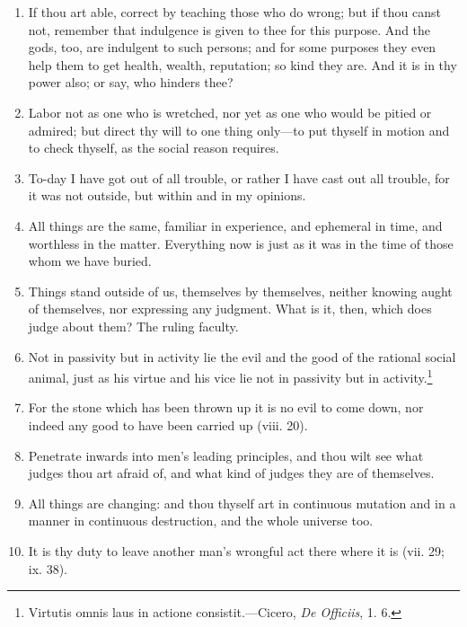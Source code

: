\begin{enumerate}
\item If thou art able, correct by teaching those who do wrong; but if thou canst not, remember that indulgence is given to thee for this purpose. And the gods, too, are indulgent to such persons; and for some purposes they even help them to get health, wealth, reputation; so kind they are. And it is in thy power also; or say, who hinders thee?

\item Labor not as one who is wretched, nor yet as one who would be pitied or admired; but direct thy will to one thing only—to put thyself in motion and to check thyself, as the social reason requires.

\item To-day I have got out of all trouble, or rather I have cast out all trouble, for it was not outside, but within and in my opinions.

\item All things are the same, familiar in experience, and ephemeral in time, and worthless in the matter. Everything now is just as it was in the time of those whom we have buried.

\item Things stand outside of us, themselves by themselves, neither knowing aught of themselves, nor expressing any judgment. What is it, then, which does judge about them? The ruling faculty.

\item Not in passivity but in activity lie the evil and the good of the rational social animal, just as his virtue and his vice lie not in passivity but in activity.\footnote{Virtutis omnis laus in actione consistit.—Cicero, \textit{De Officiis}, 1. 6.}

\item For the stone which has been thrown up it is no evil to come down, nor indeed any good to have been carried up (viii. 20).

\item Penetrate inwards into men's leading principles, and thou wilt see what judges thou art afraid of, and what kind of judges they are of themselves.

\item All things are changing: and thou thyself art in continuous mutation and in a manner in continuous destruction, and the whole universe too.

\item It is thy duty to leave another man's wrongful act there where it is (vii. 29; ix. 38).


\end{enumerate}
